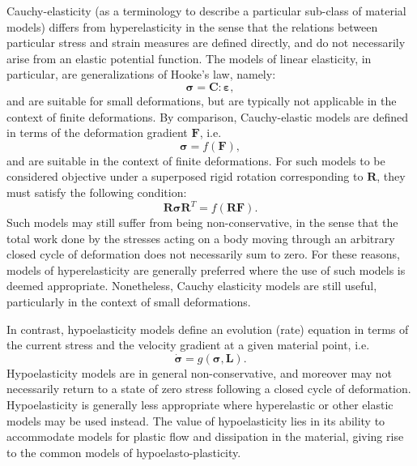 Cauchy-elasticity (as a terminology to describe a particular sub-class of material models) differs from hyperelasticity in the sense that the relations between particular stress and strain measures are defined directly, and do not necessarily arise from an elastic potential function. The models of linear elasticity, in particular, are generalizations of Hooke's law, namely:
\begin{equation}
  \boldsymbol{\sigma} = \mathbf{C} \colon \boldsymbol{\varepsilon},
\end{equation}
and are suitable for small deformations, but are typically not applicable in the context of finite deformations. By comparison, Cauchy-elastic models are defined in terms of the deformation gradient $\mathbf{F}$, i.e.
\begin{equation}
  \boldsymbol{\sigma} = f (\mathbf{F}),
\end{equation}
and are suitable in the context of finite deformations. For such models to be considered objective under a superposed rigid rotation corresponding to $\mathbf{R}$, they must satisfy the following condition:
\begin{equation}
  \mathbf{R} \boldsymbol{\sigma} \mathbf{R}^T = f (\mathbf{R} \mathbf{F}).
\end{equation}
Such models may still suffer from being non-conservative, in the sense that the total work done by the stresses acting on a body moving through an arbitrary closed cycle of deformation does not necessarily sum to zero. For these reasons, models of hyperelasticity are generally preferred where the use of such models is deemed appropriate. Nonetheless, Cauchy elasticity models are still useful, particularly in the context of small deformations.

In contrast, hypoelasticity models define an evolution (rate) equation in terms of the current stress and the velocity gradient at a given material point, i.e.
\begin{equation}
  \dot{\boldsymbol{\sigma}} = g(\boldsymbol{\sigma}, \mathbf{L}).
\end{equation}
Hypoelasticity models are in general non-conservative, and moreover may not necessarily return to a state of zero stress following a closed cycle of deformation. Hypoelasticity is generally less appropriate where hyperelastic or other elastic models may be used instead. The value of hypoelasticity lies in its ability to accommodate models for plastic flow and dissipation in the material, giving rise to the common models of hypoelasto-plasticity.

